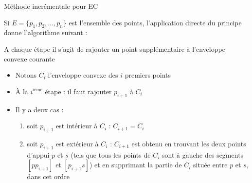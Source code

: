 \documentclass[aspectratio=1610,francais,envcountsect]{beamer}
\begin{document}
\begin{frame}[allowframebreaks]{Méthode incrémentale pour EC}

  Si $E = \{p_1, p_2,\ldots , p_n\}$ est l’ensemble des points,
  l’application directe du principe donne l’algorithme suivant :
  \begin{algorithm}[H]
    \DontPrintSemicolon {}
     
  \end{algorithm}

  A chaque étape il s’agit de rajouter un point supplémentaire à
  l’enveloppe convexe courante

  \framebreak

  \begin{itemize}
  \item Notons $C_i$ l’enveloppe convexe des $i$ premiers points
  
  \item À la $i^\text{ième}$ étape : il faut rajouter $p_{i+1}$ à
    $C_i$
  \item Il y a deux cas :
    \begin{enumerate}
    \item soit $p_{i+1}$ est intérieur à $C_i$ : $C_{i+1} = C_i$
    \item soit $p_{i+1}$ est extérieur à $C_i$ : $C_{i+1}$ est obtenu
      en trouvant les deux points d’appui $p$ et $s$ (tels que tous
      les points de $C_i$ sont à gauche des segments $[pp_{i+1}]$ et
      $[p_{i+1}s]$) et en supprimant la partie de $C_i$ située entre
      $p$ et $s$, dans cet ordre
    \end{enumerate}

  \end{itemize}

  \begin{columns}
    \begin{column}{0.45\textwidth}
      \begin{center}
      \end{center}
    \end{column}


\end{columns}
\end{frame}
\end{document}

